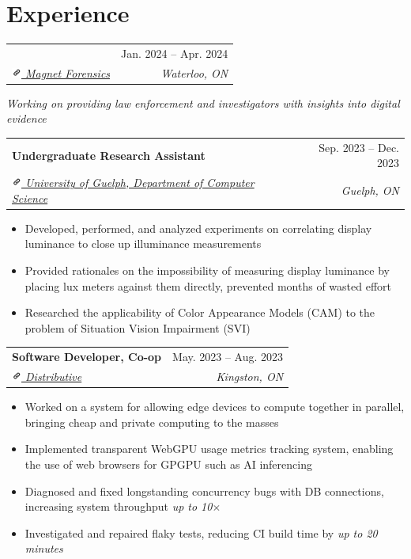 \documentclass[letterpaper, 10pt]{report}
\makeatletter
\newcommand{\resumeSubheading}[4]{
    \begin{tabular*}{\textwidth}[t]{l@{\extracolsep{\fill}}r}
        \textbf{#1}       & #2                \\
        \textit{\small#3} & \textit{\small#4} \\
    \end{tabular*}\vspace{-0.7em}
}
\newenvironment{ResumeItem}{
    \vspace{-0.3em}
    \begin{itemize}
        \setlength\itemsep{-0.3em}
        }{
    \end{itemize}\vspace{-0.3em}}
\newcommand{\linkIcon}{\includegraphics[height=9pt, trim=0 5cm 0 -1.5cm]{./img/link-icon}}
\makeatother
\begin{document}
    \section{Experience}
    \resumeSubheading
    {\color{Black}{Software Developer, Co-op}}{Jan. 2024 -- Apr. 2024}
    {\href{https://www.magnetforensics.com/}{\linkIcon{} Magnet Forensics}}{Waterloo, ON}
    \begin{center}
    \itshape{Working on providing law enforcement and investigators with insights into digital evidence}
    \end{center}
    \resumeSubheading
    {Undergraduate Research Assistant}{Sep. 2023 -- Dec. 2023}
    {\href{https://www.uoguelph.ca/computing}{\linkIcon{} University of Guelph, Department of Computer Science}}{Guelph, ON}
    \begin{ResumeItem}
        \item{Developed, performed, and analyzed experiments on correlating display luminance to close up illuminance measurements}
        \item{Provided rationales on the impossibility of measuring display luminance by placing lux meters against them directly, prevented months of wasted effort}
        \item{Researched the applicability of Color Appearance Models (CAM) to the problem of Situation Vision Impairment (SVI)}
    \end{ResumeItem}

    \resumeSubheading
    {Software Developer, Co-op}{May. 2023 -- Aug. 2023}
    {\href{https://kingsds.network/}{\linkIcon{} Distributive}}{Kingston, ON}
    \begin{ResumeItem}
        \item{Worked on a system for allowing edge devices to compute together in parallel, bringing cheap and private computing to the masses}
        \item{Implemented transparent WebGPU usage metrics tracking system, enabling the use of web browsers for GPGPU such as AI inferencing}
        \item{Diagnosed and fixed longstanding concurrency bugs with DB connections, increasing system throughput \emph{up to 10\(\times\)}}
        \item{Investigated and repaired flaky tests, reducing CI build time by \emph{up to 20 minutes}}
    \end{ResumeItem}
\end{document}
